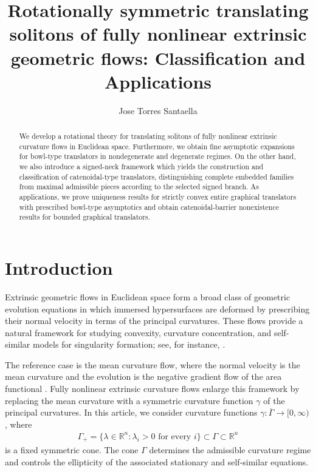 \documentclass{amsart}
\title[Rotationally symmetric translating solitons]%
{Rotationally symmetric translating solitons of fully nonlinear extrinsic geometric flows: Classification and Applications}
\author{Jose Torres Santaella}
\theoremstyle{plain}
\theoremstyle{mainintrothm}
\theoremstyle{definition}
\begin{document}
\begin{abstract}
We develop a rotational theory for translating solitons of fully nonlinear
extrinsic curvature flows in Euclidean space.  Furthermore, we obtain fine asymptotic
expansions for bowl-type translators in nondegenerate and degenerate regimes.
On the other hand, we also introduce a signed-neck framework which yields the construction and
classification of catenoidal-type translators, distinguishing complete embedded
families from maximal admissible pieces according to the selected signed
branch.  As applications, we prove uniqueness results for strictly convex
entire graphical translators with prescribed bowl-type asymptotics and obtain
catenoidal-barrier nonexistence results for bounded graphical translators.
\end{abstract}

\maketitle

\section{Introduction}
\label{sec:introduction}

Extrinsic geometric flows in Euclidean space form a broad class of geometric
evolution equations in which immersed hypersurfaces are deformed by prescribing
their normal velocity in terms of the principal curvatures.  These flows provide
a natural framework for studying convexity, curvature concentration, and
self-similar models for singularity formation; see, for instance,
\cite{mantegazza2011lecture,andrews-mccoy-zheng-contracting}.

\medskip

The reference case is the mean curvature flow, where the normal velocity is the
mean curvature and the evolution is the negative gradient flow of the area
functional \cite{mantegazza2011lecture}.  Fully nonlinear extrinsic curvature
flows enlarge this framework by replacing the mean curvature with a symmetric
curvature function $\gamma$ of the principal curvatures.  In this article, we
consider curvature functions $\gamma:\overline{\Gamma}\to[0,\infty)$, where
\begin{align*}
	\Gamma_+=\{\lambda\in\mathbb R^n:\lambda_i>0\text{ for every }i\}
	\subset
	\Gamma
	\subset
	\mathbb R^n
\end{align*}
is a fixed symmetric cone.  The cone $\Gamma$ determines the admissible
curvature regime and controls the ellipticity of the associated stationary and
self-similar equations.
\end{document}
